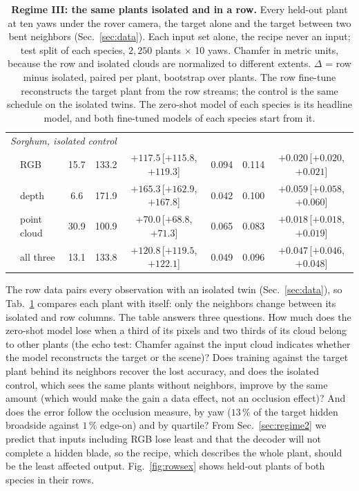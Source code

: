 \begin{table}[t]
\begin{tabular}{l l ccc ccc}
    \midrule
    \multicolumn{8}{l}{\emph{Sorghum, isolated control}} \\
    & RGB         & 15.7 & 133.2 & $+117.5$\,{\tiny[$+115.8$, $+119.3$]} & 0.094 & 0.114 & $+0.020$\,{\tiny[$+0.020$, $+0.021$]} \\
    & depth       & 6.6 & 171.9 & $+165.3$\,{\tiny[$+162.9$, $+167.8$]} & 0.042 & 0.100 & $+0.059$\,{\tiny[$+0.058$, $+0.060$]} \\
    & point cloud & 30.9 & 100.9 & $+70.0$\,{\tiny[$+68.8$, $+71.3$]} & 0.065 & 0.083 & $+0.018$\,{\tiny[$+0.018$, $+0.019$]} \\
    & all three   & 13.1 & 133.8 & $+120.8$\,{\tiny[$+119.5$, $+122.1$]} & 0.049 & 0.096 & $+0.047$\,{\tiny[$+0.046$, $+0.048$]} \\
    \bottomrule
  \end{tabular}
  \caption{\textbf{Regime III: the same plants isolated and in a row.} Every
  held-out plant at ten yaws under the rover camera, the target alone and the
  target between two bent neighbors (Sec.~\ref{sec:data}). Each input set alone,
  the recipe never an input; test split of each species, $2{,}250$ plants
  $\times$ 10 yaws. Chamfer in metric units, because the row and isolated clouds are
  normalized to different extents. $\Delta$ = row minus isolated, paired per
  plant, bootstrap over plants. The row fine-tune reconstructs the target plant
  from the row streams; the control is the same schedule on the isolated twins.
  The zero-shot model of each species is its headline model, and both
  fine-tuned models of each species start from it.}
  \label{tab:rows}
\end{table}

The row data pairs every observation with an isolated twin (Sec.~\ref{sec:data}),
so Tab.~\ref{tab:rows} compares each plant with itself: only the neighbors
change between its isolated and row columns. The table answers three
questions. How much does the zero-shot model lose when a third of its pixels and
two thirds of its cloud belong to other plants (the echo test: Chamfer against
the input cloud indicates whether the model reconstructs the target or the
scene)? Does training against the target plant behind its neighbors recover the
lost accuracy, and does the isolated control, which sees the same plants without
neighbors, improve by the same amount (which would make the gain a data effect,
not an occlusion effect)? And does the error follow the occlusion measure, by
yaw ($13\,\%$ of the target hidden broadside against $1\,\%$ edge-on) and by
quartile? From Sec.~\ref{sec:regime2} we predict that inputs including RGB lose
least and that the decoder will not complete a hidden blade, so the recipe,
which describes the whole plant, should be the least affected output.
Fig.~\ref{fig:rowsex} shows held-out plants of both species in their rows.

